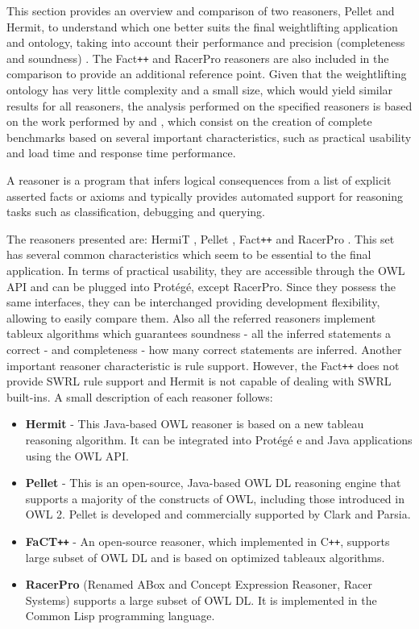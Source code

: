 
This section provides an overview and comparison of two reasoners, Pellet and Hermit, to understand which one better suits the final weightlifting application and ontology, taking into account their performance and precision (completeness and soundness) . The Fact\texttt{++} and RacerPro reasoners are also included in the comparison to provide an additional reference point. Given that the weightlifting ontology has very little complexity and a small size, which would yield similar results for all reasoners, the analysis performed on the specified reasoners is based on the work performed by \cite{Dentler2011} and \cite{Bock2008}, which consist on the creation of complete benchmarks based on several important characteristics, such as practical usability and load time and response time performance.

A reasoner is a program that infers logical consequences from a list of explicit asserted facts or axioms and typically provides automated support for reasoning tasks such as classification, debugging and querying.

The reasoners presented are: HermiT \cite{1_hermitreasoner}, Pellet \cite{2_stardog-union/pellet_2016}, Fact\texttt{++} \cite{3_fact++reasoner} and RacerPro \cite{4_racerpro_2016}. This set has several common characteristics which seem to be essential to the final application. In terms of practical usability, they are accessible through the OWL API and can be plugged into Protégé, except RacerPro. Since they possess the same interfaces, they can be interchanged providing development flexibility, allowing to easily compare them. Also all the referred reasoners implement tableux algorithms which guarantees soundness - all the inferred statements a correct - and completeness - how many correct statements are inferred. Another important reasoner characteristic is rule support. However, the Fact\texttt{++} does not provide SWRL rule support and Hermit is not capable of dealing with SWRL built-ins. A small description of each reasoner follows:

\begin{itemize}
\item \textbf{Hermit} - This Java-based OWL reasoner is based on a new tableau reasoning algorithm. It can be integrated into Protégé e and Java applications using the OWL API.
\item \textbf{Pellet} - This is an open-source, Java-based OWL DL reasoning engine that supports a majority of the constructs of OWL, including those introduced in OWL 2. Pellet is developed and commercially supported by Clark and Parsia.
\item \textbf{FaCT\texttt{++}} - An open-source reasoner, which implemented in C\texttt{++}, supports large subset of OWL DL and is based on optimized tableaux algorithms.
\item \textbf{RacerPro} (Renamed ABox and Concept Expression
Reasoner, Racer Systems) supports a large subset of OWL DL. It is implemented in the Common Lisp programming language.
\end{itemize}

